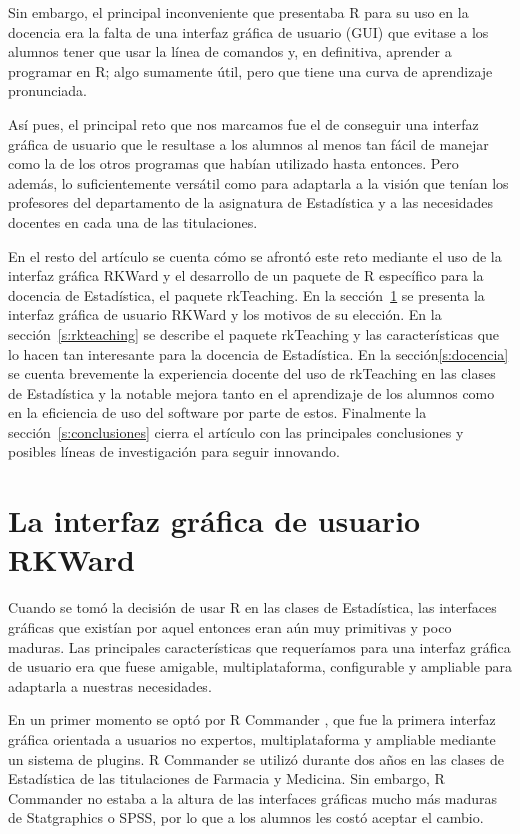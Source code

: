 \documentclass[a4paper,10pt,twoside]{article}
\newcommand{\rkteaching}{\textsf{rkTeaching}}
\newcommand{\rkward}{\textsf{RKWard}}
\newcommand{\spss}{\textsf{SPSS}}
\newcommand{\statgraphics}{\textsf{Statgraphics}}
\newcommand{\rcommander}{\textsf{R Commander}}
\begin{document}
Sin embargo, el principal inconveniente que presentaba R para su uso en la docencia era la falta de una interfaz
gráfica de usuario (GUI) que evitase a los alumnos tener que usar la línea de comandos y, en definitiva, aprender a
programar en R; algo sumamente útil, pero que tiene una curva de aprendizaje pronunciada. 

Así pues, el principal reto que nos marcamos fue el de conseguir una interfaz gráfica de usuario que le resultase a los
alumnos al menos tan fácil de manejar como la de los otros programas que habían utilizado hasta entonces.
Pero además, lo suficientemente versátil como para adaptarla a la visión que tenían los profesores del departamento de
la asignatura de Estadística y a las necesidades docentes en cada una de las titulaciones.

En el resto del artículo se cuenta cómo se afrontó este reto mediante el uso de la interfaz gráfica \rkward{} y el
desarrollo de un paquete de R específico para la docencia de Estadística, el paquete \rkteaching. 
En la sección~\ref{s:rkward} se presenta la interfaz gráfica de usuario \rkward{} y los motivos de su elección. 
En la sección~\ref{s:rkteaching} se describe el paquete \rkteaching{} y las características que lo hacen tan interesante
para la docencia de Estadística. 
En la sección\ref{s:docencia} se cuenta brevemente la experiencia docente del uso de rkTeaching en las clases de
Estadística y la notable mejora tanto en el aprendizaje de los alumnos como en la eficiencia de uso del software por
parte de estos. 
Finalmente la sección~\ref{s:conclusiones} cierra el artículo con las principales conclusiones y posibles líneas de
investigación para seguir innovando.


\section{La interfaz gráfica de usuario \rkward}
\label{s:rkward}
Cuando se tomó la decisión de usar R en las clases de Estadística, las interfaces gráficas que existían por aquel
entonces eran aún muy primitivas y poco maduras.
Las principales características que requeríamos para una interfaz gráfica de usuario era que fuese amigable,
multiplataforma, configurable y ampliable para adaptarla a nuestras necesidades.

En un primer momento se optó por \rcommander{} \cite{fox2005r}, que fue la primera interfaz gráfica orientada a
usuarios no expertos, multiplataforma y ampliable mediante un sistema de plugins.
\rcommander{} se utilizó durante dos años en las clases de Estadística de las titulaciones de Farmacia y
Medicina.
Sin embargo, \rcommander{} no estaba a la altura de las interfaces gráficas mucho más maduras de \statgraphics{} o
\spss{}, por lo que a los alumnos les costó aceptar el cambio. 
\end{document}
